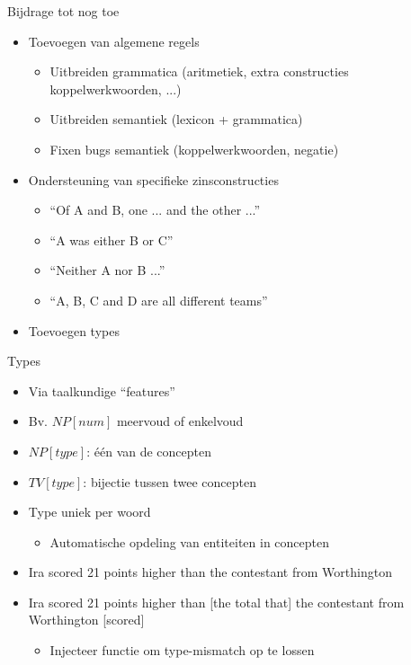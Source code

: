 \documentclass[notes, dvipsnames]{beamer}
\newcommand{\seperation}{
	\vspace{1em}
	\ppause
}
\newcommand{\hitem}{
	\ppause
	\item
}
\newcommand{\ppause}{\onslide<+>}
\begin{document}
	\begin{frame}{Bijdrage tot nog toe}
    \begin{itemize}
      \hitem Toevoegen van algemene regels
        \begin{itemize}
          \item Uitbreiden grammatica (aritmetiek, extra constructies koppelwerkwoorden, ...)
          \item Uitbreiden semantiek (lexicon + grammatica)
          \item Fixen bugs semantiek (koppelwerkwoorden, negatie)
        \end{itemize}
      \hitem Ondersteuning van specifieke zinsconstructies
        \begin{itemize}
          \item ``Of A and B, one ... and the other ...''
          \item ``A was either B or C''
          \item ``Neither A nor B ...''
          \item ``A, B, C and D are all different teams''
        \end{itemize}
      \hitem Toevoegen types
    \end{itemize}
	\end{frame}

	\begin{frame}{Types}
    \begin{itemize}
      \hitem Via taalkundige ``features''
      \item Bv. $NP[num]$ meervoud of enkelvoud
      \hitem $NP[type]$: één van de concepten
      \item $TV[type]$: bijectie tussen twee concepten
      \hitem Type uniek per woord
      \begin{itemize}
        \item Automatische opdeling van entiteiten in concepten
      \end{itemize}

      \seperation
      \item Ira scored 21 points higher than the contestant from Worthington
      \hitem Ira scored 21 points higher than [the total that] the contestant from Worthington [scored]
      \begin{itemize}
          \item Injecteer functie om type-mismatch op te lossen
      \end{itemize}
    \end{itemize}
	\end{frame}
\end{document}
